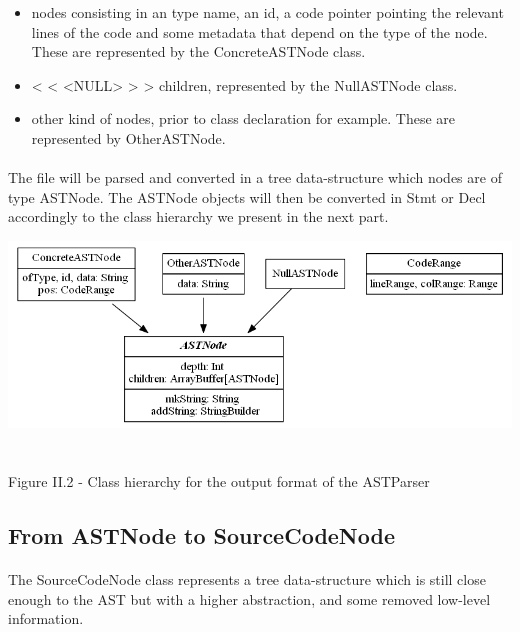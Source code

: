 \documentclass{report}
\begin{document}
\vspace{1.5mm}
\begin{itemize}
\item nodes consisting in an type name, an id, a code pointer pointing the relevant lines of the code and some
metadata that depend on the type of the node. These are represented by the ConcreteASTNode class.\vspace{1mm}
\item < < <NULL> > > children, represented by the NullASTNode class.\vspace{1mm}
\item other kind of nodes, prior to class declaration for example. These are represented by OtherASTNode.\vspace{1mm}
\end{itemize}

\paragraph{}
\hspace{4mm}\textnormal{The file will be parsed and converted in a tree data-structure which nodes are of type ASTNode. The ASTNode objects
will then be converted in Stmt or Decl accordingly to the class hierarchy we present in the next part.}

\begin{center}
\includegraphics[scale=0.5]{data/AST_classes.png}
~\\~\\Figure II.2 - Class hierarchy for the output format of the ASTParser
\end{center}

\subsection{From ASTNode to SourceCodeNode}

\paragraph{}
\hspace{4mm}\textnormal{The SourceCodeNode class represents a tree data-structure which is still close enough to the AST 
but with a higher abstraction, and some removed low-level information.}
\end{document}
